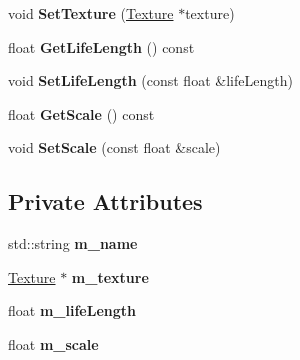 \begin{DoxyCompactItemize}
\mbox{\label{class_flounder_1_1_particle_type_a098e21b2cc8f7510901ae33094ffd6e0}} 
void {\bfseries Set\+Texture} (\hyperlink{class_flounder_1_1_texture}{Texture} $\ast$texture)
\item 
\mbox{\label{class_flounder_1_1_particle_type_a406a06c769bf12243465e9c05c162a81}} 
float {\bfseries Get\+Life\+Length} () const
\item 
\mbox{\label{class_flounder_1_1_particle_type_a5b8b091cac081035961ed2c5fa1f5a49}} 
void {\bfseries Set\+Life\+Length} (const float \&life\+Length)
\item 
\mbox{\label{class_flounder_1_1_particle_type_adba43c526af72df51fe83a5116ed6286}} 
float {\bfseries Get\+Scale} () const
\item 
\mbox{\label{class_flounder_1_1_particle_type_a895395ef544261c4881446599ff1f163}} 
void {\bfseries Set\+Scale} (const float \&scale)
\end{DoxyCompactItemize}
\subsection*{Private Attributes}
\begin{DoxyCompactItemize}
\item 
\mbox{\label{class_flounder_1_1_particle_type_a97da457b801f2b0b965ea33dd4fd906f}} 
std\+::string {\bfseries m\+\_\+name}
\item 
\mbox{\label{class_flounder_1_1_particle_type_a060a79460928d5f64827e8f70edb0d56}} 
\hyperlink{class_flounder_1_1_texture}{Texture} $\ast$ {\bfseries m\+\_\+texture}
\item 
\mbox{\label{class_flounder_1_1_particle_type_a0316fd9122277708f9a5aa021f8cbcb1}} 
float {\bfseries m\+\_\+life\+Length}
\item 
\mbox{\label{class_flounder_1_1_particle_type_a2ffcd19532e5c21483c59c507f03a12d}} 
float {\bfseries m\+\_\+scale}
\end{DoxyCompactItemize}


